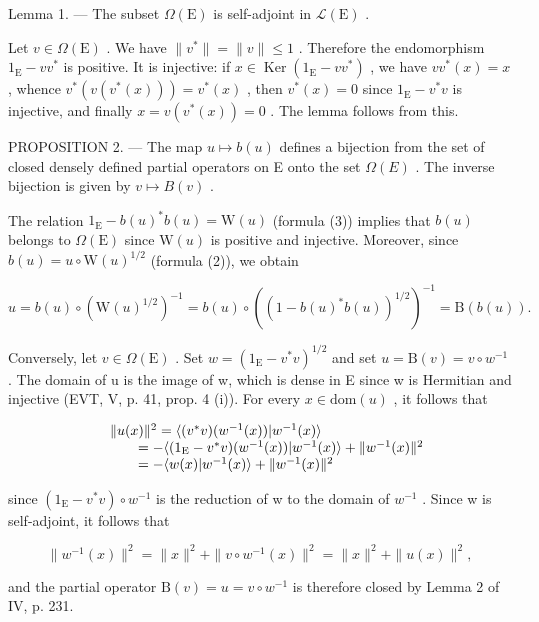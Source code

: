Lemma 1. --- The subset \(\Omega(\mathrm{E})\) is self-adjoint in \(\mathcal{L}(\mathrm{E})\) .

Let \(v \in \Omega(\mathrm{E})\) . We have \(\|v^{*}\| = \|v\| \leqslant 1\) . Therefore the endomorphism \(1_{\mathrm{E}} - vv^{*}\) is positive. It is injective: if \(x \in \operatorname{Ker}(1_{\mathrm{E}} - vv^{*})\) , we have \(vv^{*}(x) = x\) , whence \(v^{*}(v(v^{*}(x))) = v^{*}(x)\) , then \(v^{*}(x) = 0\) since \(1_{\mathrm{E}} - v^{*}v\) is injective, and finally \(x = v(v^{*}(x)) = 0\) . The lemma follows from this.

PROPOSITION 2. — The map \(u \mapsto b(u)\) defines a bijection from the set of closed densely defined partial operators on E onto the set \(\Omega(E)\) . The inverse bijection is given by \(v \mapsto B(v)\) .

The relation \(1_{\mathrm{E}} - b(u)^{*}b(u) = \mathrm{W}(u)\) (formula (3)) implies that \(b(u)\) belongs to \(\Omega (\mathrm{E})\) since \(\mathrm{W}(u)\) is positive and injective. Moreover, since \(b(u) = u\circ \mathrm{W}(u)^{1 / 2}\) (formula (2)), we obtain

\[
u = b (u) \circ (\mathrm{W} (u) ^ {1 / 2}) ^ {- 1} = b (u) \circ ((1 - b (u) ^ {*} b (u)) ^ {1 / 2}) ^ {- 1} = \mathrm{B} (b (u)).
\]

Conversely, let \(v \in \Omega(\mathrm{E})\) . Set \(w = (1_{\mathrm{E}} - v^{*}v)^{1/2}\) and set \(u = \mathrm{B}(v) = v \circ w^{-1}\) . The domain of u is the image of w, which is dense in E since w is Hermitian and injective (EVT, V, p. 41, prop. 4 (i)). For every \(x \in \mathrm{dom}(u)\) , it follows that

\[
\begin{array}{r l} & {\| u (x) \| ^ {2} = \langle (v ^ {*} v) (w ^ {- 1} (x)) | w ^ {- 1} (x) \rangle} \\ & {\qquad = - \langle (1 _ {\mathrm{E}} - v ^ {*} v) (w ^ {- 1} (x)) | w ^ {- 1} (x) \rangle + \| w ^ {- 1} (x) \| ^ {2}} \\ & {\qquad = - \langle w (x) | w ^ {- 1} (x) \rangle + \| w ^ {- 1} (x) \| ^ {2}} \end{array}
\]

since \((1_{\mathrm{E}} - v^{*}v) \circ w^{-1}\) is the reduction of w to the domain of \(w^{-1}\) . Since w is self-adjoint, it follows that

\[
\| w ^ {- 1} (x) \| ^ {2} = \| x \| ^ {2} + \| v \circ w ^ {- 1} (x) \| ^ {2} = \| x \| ^ {2} + \| u (x) \| ^ {2},
\]

and the partial operator \(\mathrm{B}(v) = u = v \circ w^{-1}\) is therefore closed by Lemma 2 of IV, p. 231.

